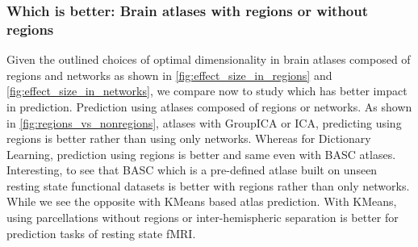 \documentclass[5p]{elsarticle}
\begin{document}
\subsubsection{Which is better: Brain atlases with regions or without regions}
Given the outlined choices of optimal dimensionality in brain atlases composed
of regions and networks as shown in \autoref{fig:effect_size_in_regions}
and \autoref{fig:effect_size_in_networks}, we compare now to study which has
better impact in prediction. Prediction using atlases composed of regions or
networks. As shown in
\autoref{fig:regions_vs_nonregions}, atlases with GroupICA or ICA, predicting
using regions is better rather than using only networks. Whereas for
Dictionary Learning, prediction using regions is better and same even with
BASC atlases. Interesting, to see that BASC which is a pre-defined atlase
built on unseen resting state functional datasets is better with regions
rather than only networks. While we see the opposite with KMeans based atlas
prediction. With KMeans, using parcellations without regions or
inter-hemispheric separation is better for prediction tasks of resting state
fMRI.

\end{document}
